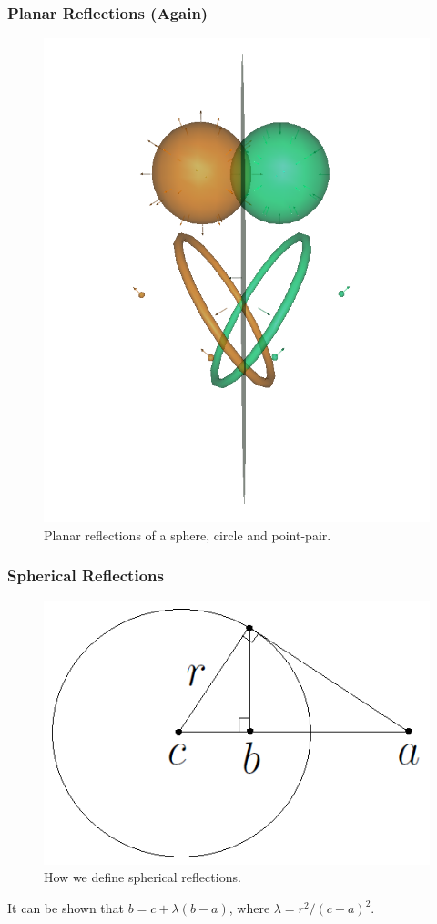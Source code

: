 \documentclass{beamer}
\begin{document}
\begin{frame}
\frametitle{Planar Reflections (Again)}
\begin{figure}
\centering
\includegraphics[scale=0.3]{PlanarReflectionsPerspectiveTwo}
\caption{Planar reflections of a sphere, circle and point-pair.}
\end{figure}
\end{frame}

\begin{frame}
\frametitle{Spherical Reflections}
\begin{figure}
\centering
\includegraphics[scale=0.3]{SphericalReflectionFigure}
\caption{How we define spherical reflections.}
\end{figure}\pause
It can be shown that $b = c+\lambda(b-a)$, where $\lambda=r^2/(c-a)^2$.
\end{frame}
\end{document}
